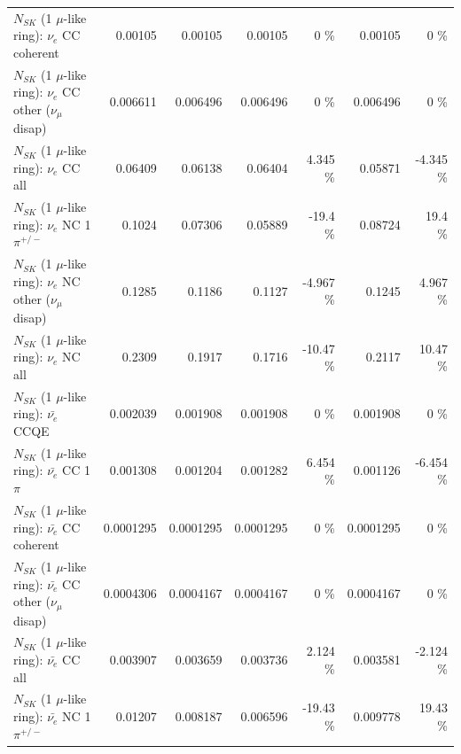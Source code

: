 \begin{table}
\begin{tabular}{| l | r | r | r  r | r  r |}
                               $N_{SK}$ (1 $\mu$-like ring): $\nu_e$ CC coherent &         0.00105 &         0.00105 &         0.00105 &        0 \%  &         0.00105 &        0 \%  \\ 
                $N_{SK}$ (1 $\mu$-like ring): $\nu_e$ CC other ($\nu_\mu$ disap) &        0.006611 &        0.006496 &        0.006496 &        0 \%  &        0.006496 &        0 \%  \\ 
                                  $N_{SK}$ (1 $\mu$-like ring): $\nu_{e}$ CC all &         0.06409 &         0.06138 &         0.06404 &    4.345 \%  &         0.05871 &   -4.345 \%  \\ 
\hline
                           $N_{SK}$ (1 $\mu$-like ring): $\nu_e$ NC 1$\pi^{+/-}$ &          0.1024 &         0.07306 &         0.05889 &    -19.4 \%  &         0.08724 &     19.4 \%  \\ 
                $N_{SK}$ (1 $\mu$-like ring): $\nu_e$ NC other ($\nu_\mu$ disap) &          0.1285 &          0.1186 &          0.1127 &   -4.967 \%  &          0.1245 &    4.967 \%  \\ 
                                  $N_{SK}$ (1 $\mu$-like ring): $\nu_{e}$ NC all &          0.2309 &          0.1917 &          0.1716 &   -10.47 \%  &          0.2117 &    10.47 \%  \\ 
\hline
\hline
\hline
                                $N_{SK}$ (1 $\mu$-like ring): $\bar{\nu_e}$ CCQE &        0.002039 &        0.001908 &        0.001908 &        0 \%  &        0.001908 &        0 \%  \\ 
                           $N_{SK}$ (1 $\mu$-like ring): $\bar{\nu_e}$ CC 1$\pi$ &        0.001308 &        0.001204 &        0.001282 &    6.454 \%  &        0.001126 &   -6.454 \%  \\ 
                         $N_{SK}$ (1 $\mu$-like ring): $\bar{\nu_e}$ CC coherent &       0.0001295 &       0.0001295 &       0.0001295 &        0 \%  &       0.0001295 &        0 \%  \\ 
          $N_{SK}$ (1 $\mu$-like ring): $\bar{\nu_e}$ CC other ($\nu_\mu$ disap) &       0.0004306 &       0.0004167 &       0.0004167 &        0 \%  &       0.0004167 &        0 \%  \\ 
                            $N_{SK}$ (1 $\mu$-like ring): $\bar{\nu_{e}}$ CC all &        0.003907 &        0.003659 &        0.003736 &    2.124 \%  &        0.003581 &   -2.124 \%  \\ 
\hline
                     $N_{SK}$ (1 $\mu$-like ring): $\bar{\nu_e}$ NC 1$\pi^{+/-}$ &         0.01207 &        0.008187 &        0.006596 &   -19.43 \%  &        0.009778 &    19.43 \%  \\ 

\end{tabular}
\end{table}
